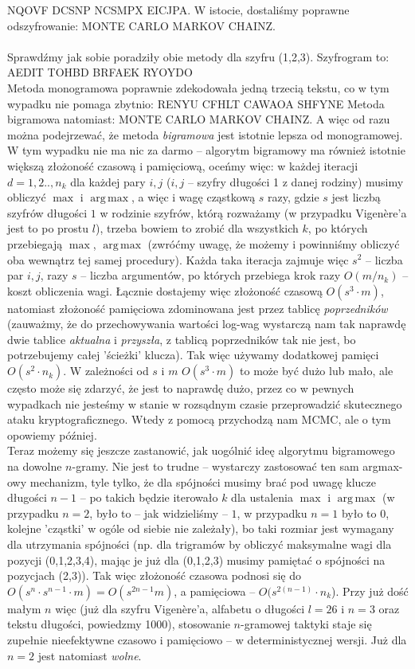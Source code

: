 \documentclass[a4paper]{article}
\DeclareMathOperator*{\argmax}{arg\,max}
\theoremstyle{defn}
\theoremstyle{theorem}
\theoremstyle{lemma}
\theoremstyle{cor}
\theoremstyle{fact}
\begin{document}
NQOVF DCSNP NCSMPX EICJPA.
W istocie, dostaliśmy poprawne odszyfrowanie:
MONTE CARLO MARKOV CHAINZ.\\
\\
Sprawdźmy jak sobie poradziły obie metody dla szyfru (1,2,3). Szyfrogram to:\\
AEDIT TOHBD BRFAEK RYOYDO\\
Metoda monogramowa poprawnie zdekodowała jedną trzecią tekstu, co w tym wypadku nie pomaga zbytnio:
RENYU CFHLT CAWAOA SHFYNE
Metoda bigramowa natomiast:
MONTE CARLO MARKOV CHAINZ. A więc od razu można podejrzewać, że metoda \textit{bigramowa} jest istotnie lepsza od monogramowej.\\
W tym wypadku nie ma nic za darmo – algorytm bigramowy ma również istotnie większą złożoność czasową i pamięciową, oceńmy więc: w każdej iteracji $d=1,2.., n_k$ dla każdej pary $i,j$ ($i,j$ – szyfry długości 1 z danej rodziny) musimy obliczyć $\max$ i $\argmax$, a więc i wagę cząstkową $s$ razy, gdzie $s$ jest liczbą szyfrów długości $1$ w  rodzinie szyfrów, którą rozważamy (w przypadku Vigenère'a jest to po prostu $l$), trzeba bowiem to zrobić dla wszystkich $k$, po których przebiegają $\max$, $\argmax$ (zwróćmy uwagę, że możemy i powinniśmy obliczyć oba wewnątrz tej samej procedury). Każda taka iteracja zajmuje więc $s^2$ – liczba par $i,j$, razy $s$ – liczba argumentów, po których przebiega krok razy $O(m/n_k)$ – koszt obliczenia wagi. Łącznie dostajemy więc złożoność czasową $O(s^3 \cdot m)$, natomiast złożoność pamięciowa zdominowana jest przez tablicę \textit{poprzedników} (zauważmy, że do przechowywania wartości log-wag wystarczą nam tak naprawdę dwie tablice \textit{aktualna} i \textit{przyszła}, z tablicą poprzedników tak nie jest, bo potrzebujemy całej 'ścieżki' klucza). Tak więc używamy dodatkowej pamięci $O(s^2 \cdot n_k)$. W zależności od $s$ i $m$ $O(s^3 \cdot m)$ to może być dużo lub mało, ale często może się zdarzyć, że jest to naprawdę dużo, przez co w pewnych wypadkach nie jesteśmy w stanie w rozsądnym czasie przeprowadzić skutecznego ataku kryptograficznego. Wtedy z pomocą przychodzą nam MCMC, ale o tym opowiemy później.\\
Teraz możemy się jeszcze zastanowić, jak uogólnić ideę algorytmu bigramowego na dowolne $n$-gramy. Nie jest to trudne – wystarczy zastosować ten sam argmax-owy mechanizm, tyle tylko, że dla spójności musimy brać pod uwagę klucze długości $n-1$ – po takich będzie iterowało $k$ dla ustalenia $\max$ i $\argmax$ (w przypadku $n=2$, było to – jak widzieliśmy – $1$, w przypadku $n=1$ było to $0$, kolejne 'cząstki' w ogóle od siebie nie zależały), bo taki rozmiar jest wymagany dla utrzymania spójności (np. dla trigramów by obliczyć maksymalne wagi dla pozycji (0,1,2,3,4), mając je już dla (0,1,2,3) musimy pamiętać o spójności na pozycjach (2,3)). Tak więc złożoność czasowa podnosi się do $O(s^n \cdot s^{n-1} \cdot m) = O(s^{2n-1}m)$, a pamięciowa – $O(s^{2(n-1)} \cdot n_k$). Przy już dość małym $n$ więc (już dla szyfru Vigenère'a, alfabetu o długości $l=26$ i $n=3$ oraz tekstu długości, powiedzmy 1000), stosowanie $n$-gramowej taktyki staje się zupełnie nieefektywne czasowo i pamięciowo – w deterministycznej wersji. Już dla $n=2$ jest natomiast \textit{wolne}.\\
\end{document}

